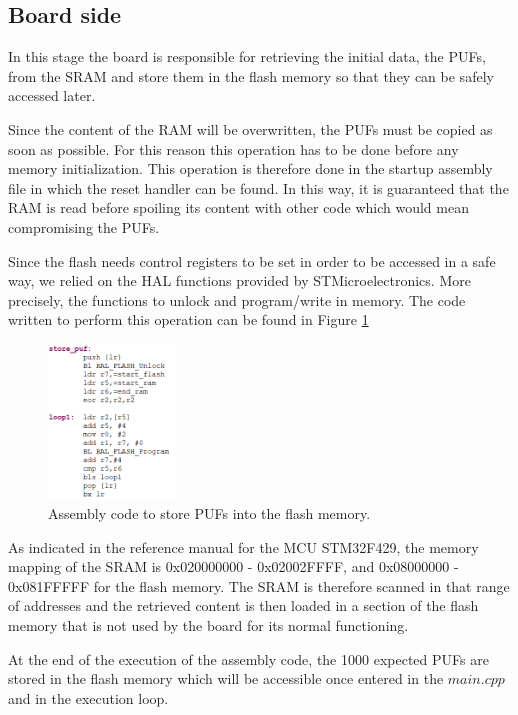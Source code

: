 \subsection{Board side}

In this stage the board is responsible for retrieving the initial data, the PUFs, from the SRAM and store them in the flash memory so that they can be safely accessed later.

Since the content of the RAM will be overwritten, the PUFs must be copied as soon as possible. For this reason this operation has to be done before any memory initialization. This operation is therefore done in the startup assembly file in which the reset handler can be found. In this way, it is guaranteed that the RAM is read before spoiling its content with other code which would mean compromising the PUFs.

Since the flash needs control registers to be set in order to be accessed in a safe way, we relied on the HAL functions provided by STMicroelectronics. More precisely, the functions to unlock and program/write in memory. The code written to perform this operation can be found in Figure \ref{fig:code_assembly}

\begin{figure}[h!]
	\centering
	\vspace{0.5cm}
	\includegraphics[width = 0.3\textwidth]{images/code_assembly.png}
	\caption{Assembly code to store PUFs into the flash memory. }
	\label{fig:code_assembly}
\end{figure}

As indicated in the reference manual for the MCU STM32F429\cite{STM32F429}, the memory mapping of the SRAM is 0x020000000 -  0x02002FFFF, and 0x08000000 - 0x081FFFFF for the flash memory. The SRAM is therefore scanned in that range of addresses and the retrieved content is then loaded in a section of the flash memory that is not used by the board for its normal functioning.

At the end of the execution of the assembly code, the 1000 expected PUFs are stored in the flash memory which will be accessible once entered in the $main.cpp$ and in the execution loop. 

